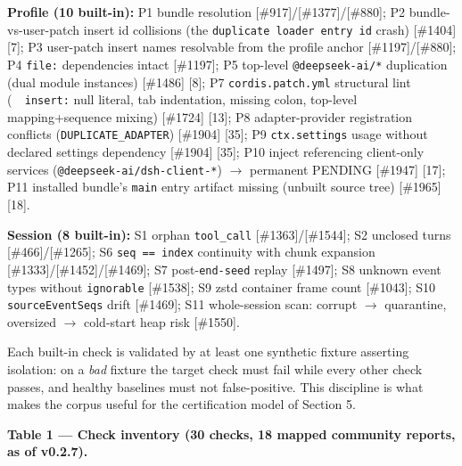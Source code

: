 \documentclass[11pt]{article}
\begin{document}
\textbf{Profile (10 built-in):} P1 bundle resolution
[\#917]/[\#1377]/[\#880]; P2 bundle-vs-user-patch insert id
collisions (the \texttt{duplicate\ loader\ entry\ id} crash)
[\#1404] [7]; P3 user-patch insert names resolvable from the
profile anchor [\#1197]/[\#880]; P4 \texttt{file:} dependencies
intact [\#1197]; P5 top-level \texttt{@deepseek-ai/*} duplication
(dual module instances) [\#1486] [8]; P7
\texttt{cordis.patch.yml} structural lint
(\texttt{~\ insert:} null literal, tab indentation,
missing colon, top-level mapping+sequence mixing) [\#1724] [13];
P8 adapter-provider registration conflicts (\texttt{DUPLICATE\_ADAPTER})
[\#1904] [35]; P9 \texttt{ctx.settings} usage without declared
settings dependency [\#1904] [35]; P10 inject referencing
client-only services (\texttt{@deepseek-ai/dsh-client-*})  $\to$  permanent
PENDING [\#1947] [17]; P11 installed bundle's \texttt{main}
entry artifact missing (unbuilt source tree) [\#1965] [18].

\textbf{Session (8 built-in):} S1 orphan \texttt{tool\_call}
[\#1363]/[\#1544]; S2 unclosed turns [\#466]/[\#1265];
S6 \texttt{seq\ ==\ index} continuity with chunk expansion
[\#1333]/[\#1452]/[\#1469]; S7 post-\texttt{end-seed} replay
[\#1497]; S8 unknown event types without \texttt{ignorable}
[\#1538]; S9 zstd container frame count [\#1043]; S10
\texttt{sourceEventSeqs} drift [\#1469]; S11 whole-session scan:
corrupt  $\to$  quarantine, oversized  $\to$  cold-start heap risk [\#1550].

Each built-in check is validated by at least one synthetic fixture
asserting isolation: on a \emph{bad} fixture the target check must fail
while every other check passes, and healthy baselines must not
false-positive. This discipline is what makes the corpus useful for the
certification model of Section 5.

\textbf{Table 1 --- Check inventory (30 checks, 18 mapped community
reports, as of v0.2.7).}

\begin{table}[H]
\centering
\caption{Check inventory (30 checks, 18 mapped community reports, v0.2.7).}
\label{tab:checks}
\end{table}
\end{document}
